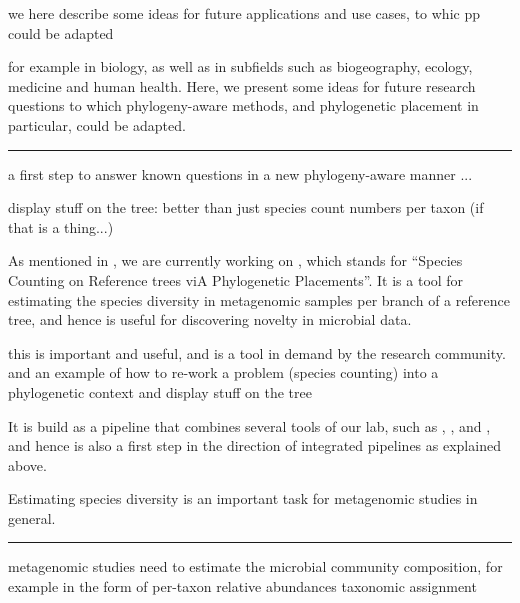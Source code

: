 we here describe some ideas for future
applications and use cases,
to whic pp could be adapted

for example
in biology, as well as in subfields such as biogeography, ecology, medicine and human health.
Here, we present some ideas for future research questions to which phylogeny-aware methods,
and phylogenetic placement in particular, could be adapted.



\noindent\rule{\textwidth}{0.4pt}

a first step to answer known questions in a new phylogeny-aware manner ...

display stuff on the tree: better than just species count numbers per taxon (if that is a thing...)


As mentioned in , we are currently working on ,
which stands for ``Species Counting on Reference trees viA Phylogenetic Placements''.
It is a tool for estimating the species diversity in metagenomic samples per branch of a reference tree,
and hence is useful for discovering novelty in microbial data.

this is important and useful, and is a tool in demand by the research community.
and an example of how to re-work a problem (species counting) into a phylogenetic context and display stuff on the tree

It is build as a pipeline that combines several tools of our lab, such as
 \cite{Barbera2018},  \cite{Morel2018}, and  \cite{Kapli2017},
and hence is also a first step in the direction of integrated pipelines as explained above.



Estimating species diversity is an important task for metagenomic studies in general.



\noindent\rule{\textwidth}{0.4pt}

metagenomic studies need to estimate the microbial community composition, for example in the form of per-taxon relative abundances \cite{Lindgreen2016}
taxonomic assignment

